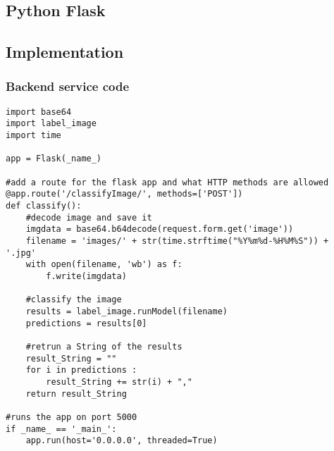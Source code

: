 \tocless\subsection{Python Flask}

\tocless\subsection{Implementation}
\tocless\subsubsection{Backend service code}
\begin{lstlisting}[style=Python]
import base64
import label_image
import time

app = Flask(_name_)

#add a route for the flask app and what HTTP methods are allowed
@app.route('/classifyImage/', methods=['POST'])
def classify():
    #decode image and save it
    imgdata = base64.b64decode(request.form.get('image'))
    filename = 'images/' + str(time.strftime("%Y%m%d-%H%M%S")) + '.jpg'
    with open(filename, 'wb') as f:
        f.write(imgdata)

    #classify the image
    results = label_image.runModel(filename)
    predictions = results[0]

    #retrun a String of the results
    result_String = ""
    for i in predictions :
        result_String += str(i) + ","
    return result_String

#runs the app on port 5000
if _name_ == '_main_':
    app.run(host='0.0.0.0', threaded=True)
\end{lstlisting}

